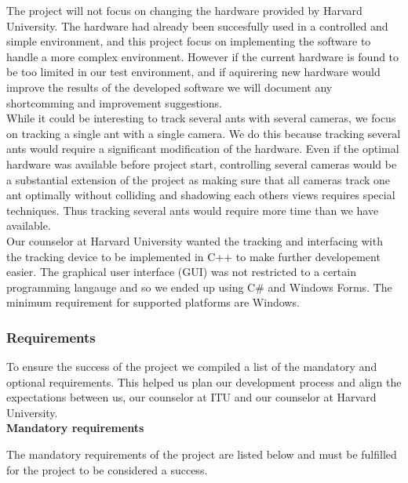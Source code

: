 The project will not focus on changing the hardware provided by Harvard University. The hardware had already been succesfully used in a controlled and simple environment, and this project focus on implementing the software to handle a more complex environment. However if the current hardware is found to be too limited in our test environment, and if aquirering new hardware would improve the results of the developed software we will document any shortcomming and improvement suggestions.\\

While it could be interesting to track several ants with several cameras, we focus on tracking a single ant with a single camera. We do this because tracking several ants would require a significant modification of the hardware. Even if the optimal hardware was available before project start, controlling several cameras would be a substantial extension of the project as making sure that all cameras track one ant optimally without colliding and shadowing each others views requires special techniques. Thus tracking several ants would require more time than we have available. \\

Our counselor at Harvard University wanted the tracking and interfacing with the tracking device to be implemented in C++ to make further developement easier. The graphical user interface (GUI) was not restricted to a certain programming langauge and so we ended up using C\# and Windows Forms. The minimum requirement for supported platforms are Windows.

\subsubsection{Requirements} \mbox{}\par
\label{requirements}

To ensure the success of the project we compiled a list of the mandatory and optional requirements. This helped us plan our development process and align the expectations between us, our counselor at ITU and our counselor at Harvard University. \\

\noindent \textbf{Mandatory requirements} \par
The mandatory requirements of the project are listed below and must be fulfilled for the project to be considered a success.

